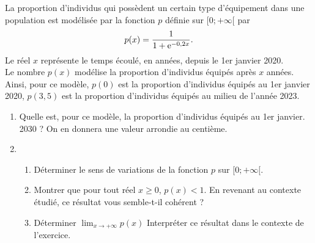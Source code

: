 \documentclass[11pt,fleqn, openany]{book} %
\begin{document}
\begin{exercise}[subtitle={(Antilles - Guyane 2019)}]
La proportion d'individus qui possèdent un certain type d'équipement dans une 
population est modélisée par la fonction $p$ définie sur $[0;+\infty[$ par
\[p(x)=\dfrac{1}{1+\mathrm{e}^{-0,2x}}.\]
Le réel $x$ représente le temps écoulé, en années, depuis le 1er janvier 2020.\\
Le nombre $p(x)$ modélise la proportion d'individus équipés après $x$ années.\\
Ainsi, pour ce modèle, $p(0)$ est la proportion d'individus équipés au 1er janvier 2020, $p(3,5)$ est la proportion d'individus équipés au milieu de l'année 2023.
\vskip10pt
\begin{enumerate}
\item Quelle est, pour ce modèle, la proportion d'individus équipés au 1er janvier.
2030 ? On en donnera une valeur arrondie au centième.
\item \begin{enumerate}
\item Déterminer le sens de variations de la fonction $p$ sur $[0;+\infty[$.
\item Montrer que pour tout réel $x\geqslant 0$, $p(x) <1$. En revenant au contexte étudié, ce résultat vous semble-t-il cohérent ?
\item  Déterminer $\displaystyle\lim_{x \to + \infty}p(x)$ Interpréter ce résultat dans le contexte de l'exercice.
\end{enumerate}
\end{enumerate}
\newpage
\end{exercise}
\end{document}

